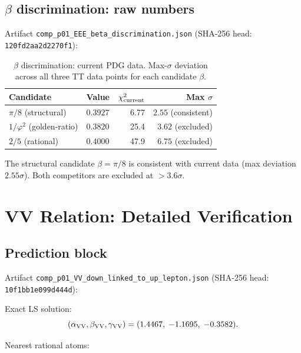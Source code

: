 \documentclass[11pt]{article}
\theoremstyle{remark}
\begin{document}
\subsection{$\beta$ discrimination: raw numbers}
\label{sec:si_eee}

Artifact \texttt{comp\_p01\_EEE\_beta\_discrimination.json}
(SHA-256 head: \texttt{120fd2aa2d2270f1}):

\begin{table}[ht]
\centering
\caption{$\beta$ discrimination: current PDG data.  Max-$\sigma$ deviation across all
three TT data points for each candidate $\beta$.}
\label{tab:si_eee}
\begin{tabular}{llrr}
\toprule
Candidate & Value & $\chi^2_{\rm current}$ & Max $\sigma$ \\
\midrule
$\pi/8$ (structural) & $0.3927$ & 6.77 & $2.55$ (consistent) \\
$1/\varphi^2$ (golden-ratio) & $0.3820$ & 25.4 & $3.62$ (excluded) \\
$2/5$ (rational) & $0.4000$ & 47.9 & $6.75$ (excluded) \\
\bottomrule
\end{tabular}
\end{table}

\noindent The structural candidate $\beta=\pi/8$ is consistent with current data
(max deviation $2.55\sigma$).  Both competitors are excluded at $>3.6\sigma$.

\section{VV Relation: Detailed Verification}
\label{sec:si_vv}

\subsection{Prediction block}
\label{sec:si_vv_block}

Artifact \texttt{comp\_p01\_VV\_down\_linked\_to\_up\_lepton.json}
(SHA-256 head: \texttt{10f1bb1e099d444d}):

Exact LS solution:
\[
  (\alpha_{\rm VV}, \beta_{\rm VV}, \gamma_{\rm VV})
  = (1.4467,\; -1.1695,\; -0.3582).
\]

Nearest rational atoms:
\end{document}

